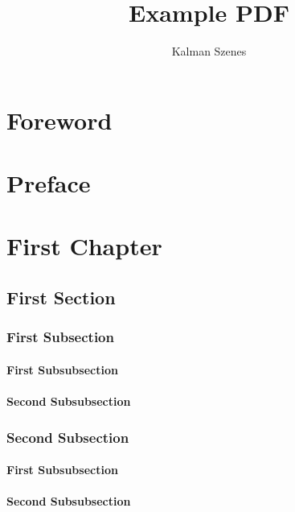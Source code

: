 \documentclass{book}
\begin{document}
\author{Kalman Szenes}
\title{Example PDF}
\maketitle

\frontmatter %
\chapter*{Foreword}
\lipsum

\chapter*{Preface}
\lipsum

\tableofcontents

\mainmatter %

\chapter{First Chapter}
\lipsum
\section{First Section}
\lipsum
\subsection{First Subsection}
\subsubsection{First Subsubsection}
\lipsum
\subsubsection{Second Subsubsection}
\lipsum
\subsection{Second Subsection}
\subsubsection{First Subsubsection}
\lipsum
\subsubsection{Second Subsubsection}
\end{document}
